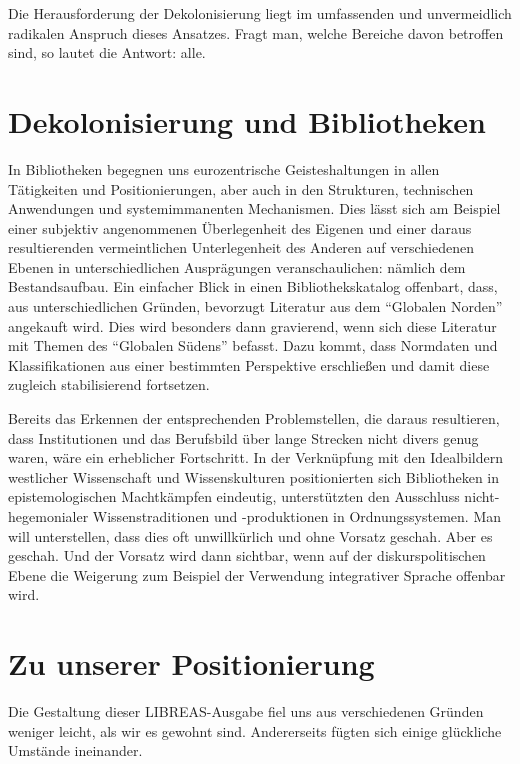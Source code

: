 \documentclass[a4paper,
fontsize=11pt,
oneside,
numbers=noperiodatend,
parskip=half-,
bibliography=totoc,
final
]{scrartcl}
\begin{document}
Die Herausforderung der Dekolonisierung liegt im umfassenden und
unvermeidlich radikalen Anspruch dieses Ansatzes. Fragt man, welche
Bereiche davon betroffen sind, so lautet die Antwort: alle.

\hypertarget{dekolonisierung-und-bibliotheken}{%
\section{Dekolonisierung und
Bibliotheken}\label{dekolonisierung-und-bibliotheken}}

In Bibliotheken begegnen uns eurozentrische Geisteshaltungen in allen
Tätigkeiten und Positionierungen, aber auch in den Strukturen,
technischen Anwendungen und systemimmanenten Mechanismen. Dies lässt
sich am Beispiel einer subjektiv angenommenen Überlegenheit des Eigenen
und einer daraus resultierenden vermeintlichen Unterlegenheit des
Anderen auf verschiedenen Ebenen in unterschiedlichen Ausprägungen
veranschaulichen: nämlich dem Bestandsaufbau. Ein einfacher Blick in
einen Bibliothekskatalog offenbart, dass, aus unterschiedlichen Gründen,
bevorzugt Literatur aus dem \enquote{Globalen Norden} angekauft wird.
Dies wird besonders dann gravierend, wenn sich diese Literatur mit
Themen des \enquote{Globalen Südens} befasst. Dazu kommt, dass Normdaten
und Klassifikationen aus einer bestimmten Perspektive erschließen und
damit diese zugleich stabilisierend fortsetzen.

Bereits das Erkennen der entsprechenden Problemstellen, die daraus
resultieren, dass Institutionen und das Berufsbild über lange Strecken
nicht divers genug waren, wäre ein erheblicher Fortschritt. In der
Verknüpfung mit den Idealbildern westlicher Wissenschaft und
Wissenskulturen positionierten sich Bibliotheken in epistemologischen
Machtkämpfen eindeutig, unterstützten den Ausschluss nicht-hegemonialer
Wissenstraditionen und -produktionen in Ordnungssystemen. Man will
unterstellen, dass dies oft unwillkürlich und ohne Vorsatz geschah. Aber
es geschah. Und der Vorsatz wird dann sichtbar, wenn auf der
diskurspolitischen Ebene die Weigerung zum Beispiel der Verwendung
integrativer Sprache offenbar wird.

\hypertarget{zu-unserer-positionierung}{%
\section{Zu unserer
Positionierung}\label{zu-unserer-positionierung}}

Die Gestaltung dieser LIBREAS-Ausgabe fiel uns aus verschiedenen Gründen
weniger leicht, als wir es gewohnt sind. Andererseits fügten sich einige
glückliche Umstände ineinander.
\end{document}
